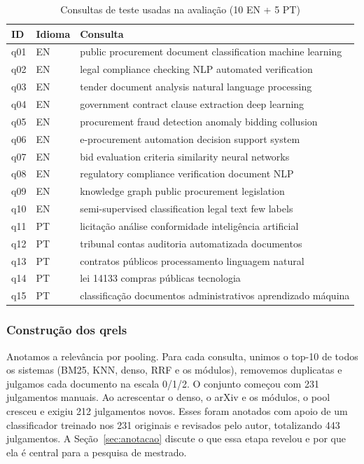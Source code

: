 \documentclass[12pt]{article}
\begin{document}
\begin{table}[h]
\centering
\caption{Consultas de teste usadas na avaliação (10 EN + 5 PT)}
\label{tab:queries}
\small
\begin{tabular}{lll}
\toprule
\textbf{ID} & \textbf{Idioma} & \textbf{Consulta} \\
\midrule
q01 & EN & public procurement document classification machine learning \\
q02 & EN & legal compliance checking NLP automated verification \\
q03 & EN & tender document analysis natural language processing \\
q04 & EN & government contract clause extraction deep learning \\
q05 & EN & procurement fraud detection anomaly bidding collusion \\
q06 & EN & e-procurement automation decision support system \\
q07 & EN & bid evaluation criteria similarity neural networks \\
q08 & EN & regulatory compliance verification document NLP \\
q09 & EN & knowledge graph public procurement legislation \\
q10 & EN & semi-supervised classification legal text few labels \\
q11 & PT & licitação análise conformidade inteligência artificial \\
q12 & PT & tribunal contas auditoria automatizada documentos \\
q13 & PT & contratos públicos processamento linguagem natural \\
q14 & PT & lei 14133 compras públicas tecnologia \\
q15 & PT & classificação documentos administrativos aprendizado máquina \\
\bottomrule
\end{tabular}
\end{table}

\subsubsection{Construção dos qrels}

Anotamos a relevância por pooling. Para cada consulta, unimos o top-10 de todos os sistemas (BM25, KNN, denso, RRF e os módulos), removemos duplicatas e julgamos cada documento na escala 0/1/2. O conjunto começou com 231 julgamentos manuais. Ao acrescentar o denso, o arXiv e os módulos, o pool cresceu e exigiu 212 julgamentos novos. Esses foram anotados com apoio de um classificador treinado nos 231 originais e revisados pelo autor, totalizando 443 julgamentos. A Seção~\ref{sec:anotacao} discute o que essa etapa revelou e por que ela é central para a pesquisa de mestrado.
\end{document}

